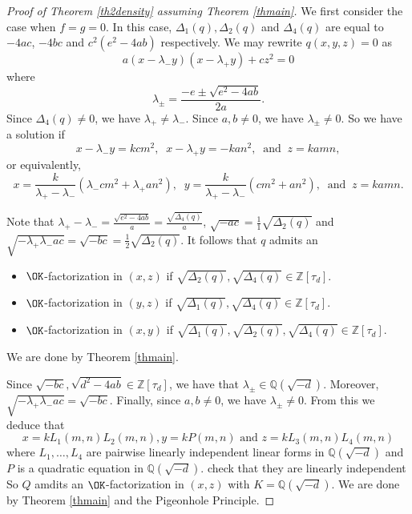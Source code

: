 \documentclass[11pt]{amsart}
\theoremstyle{definition}
\newcommand{\Q}{{\mathbb Q}}
\newcommand{\Z}{{\mathbb Z}}
\begin{document}
\begin{proof}[Proof of Theorem \ref{th2density} assuming Theorem \ref{thmain}]

    
     We first consider the case when $f=g=0$. In this case, $\Delta_{1}(q), \Delta_{2}(q)$ and $\Delta_{4}(q)$ are equal to $-4ac$, $-4bc$ and $c^2(e^{2}-4ab)$ respectively. %
    We may rewrite $q(x,y,z)=0$ as 
    $$a(x-\lambda_{-}y)(x-\lambda_{+}y)+cz^{2}=0$$
    where
    $$\lambda_{\pm}=\frac{-e\pm\sqrt{e^{2}-4ab}}{2a}.$$
    Since $\Delta_{4}(q)\neq 0$, we have $\lambda_{+}\neq \lambda_{-}$. Since $a,b\neq 0$, we have $\lambda_{\pm}\neq 0$.
    So we have a solution if 
    $$x-\lambda_{-}y=kcm^{2},\;\; x-\lambda_{+}y=-kan^{2}, \;\; \text{and}\;\; z=kamn,$$
    or equivalently,
     $$x=\frac{k}{\lambda_{+}-\lambda_{-}}(\lambda_{-}cm^{2}+\lambda_{+}an^{2}),\;\; y=\frac{k}{\lambda_{+}-\lambda_{-}}(cm^{2}+an^{2}),\;\;  \text{and}\;\; z=kamn.$$

     Note that $\lambda_{+}-\lambda_{-}=\frac{\sqrt{e^{2}-4ab}}{a}=\frac{\sqrt{\Delta_{4}(q)}}{a}$, $\sqrt{-ac}=\frac{1}{1}\sqrt{\Delta_{2}(q)}$ and  $\sqrt{-\lambda_{+}\lambda_{-}ac}=\sqrt{-bc}=\frac{1}{2}\sqrt{\Delta_{2}(q)}$. It follows that $q$ admits an 
     \begin{itemize}
    \item $\OK$-factorization in $(x,z)$ if $\sqrt{\Delta_{2}(q)},\sqrt{\Delta_{4}(q)}\in\Z[\tau_{d}]$.
    \item $\OK$-factorization in $(y,z)$ if $\sqrt{\Delta_{1}(q)},\sqrt{\Delta_{4}(q)}\in\Z[\tau_{d}]$.
    \item $\OK$-factorization in $(x,y)$ if $\sqrt{\Delta_{1}(q)},\sqrt{\Delta_{2}(q)},\sqrt{\Delta_{4}(q)}\in\Z[\tau_{d}]$.
\end{itemize}
 We are done by Theorem \ref{thmain}.
 
\iffalse

 
    Since $\sqrt{-bc}, \sqrt{d^{2}-4ab}\in\Z[\tau_{d}]$, we have that $\lambda_{\pm}\in \Q(\sqrt{-d})$.  
   Moreover, $\sqrt{-\lambda_{+}\lambda_{-}ac}=\sqrt{-bc}$. Finally, since $a,b\neq 0$, we have $\lambda_{\pm}\neq 0$. From this we deduce that
     $$x=kL_{1}(m,n)L_{2}(m,n), y=kP(m,n)  \text{ and } z=kL_{3}(m,n)L_{4}(m,n)$$
     where $L_{1},\dots,L_{4}$ are pairwise linearly independent linear forms in $\Q(\sqrt{-d})$ and $P$ is a quadratic equation in  $\Q(\sqrt{-d})$. {\color{red} check that they are linearly independent}
   So
   $Q$ amdits an $\OK$-factorization in $(x,z)$ with $K=\Q(\sqrt{-d})$. We are done by Theorem \ref{thmain} and the Pigeonhole Principle.


\end{proof}
\end{document}
